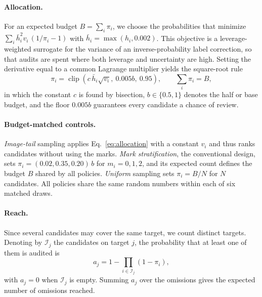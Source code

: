 \paragraph{Allocation.}
For an expected budget $B=\sum_i\pi_i$, we choose the probabilities that minimize $\sum_i \bar h_i^2 v_i\,(1/\pi_i-1)$ with $\bar h_i=\max(h_i,0.002)$. This objective is a leverage-weighted surrogate for the variance of an inverse-probability label correction, so that audits are spent where both leverage and uncertainty are high. Setting the derivative equal to a common Lagrange multiplier yields the square-root rule
\begin{equation}
 \pi_i=\operatorname{clip}\!\left(c\,\bar h_i\sqrt{v_i},\ 0.005b,\ 0.95\right),
 \qquad \textstyle\sum_i\pi_i=B,
 \label{eq:allocation}
\end{equation}
in which the constant $c$ is found by bisection, $b\in\{0.5,1\}$ denotes the half or base budget, and the floor $0.005b$ guarantees every candidate a chance of review.

\paragraph{Budget-matched controls.}
\emph{Image-tail} sampling applies Eq.~\eqref{eq:allocation} with a constant $v_i$ and thus ranks candidates without using the marks. \emph{Mark stratification}, the conventional design, sets $\pi_i=(0.02,0.35,0.20)\,b$ for $m_i=0,1,2$, and its expected count defines the budget $B$ shared by all policies. \emph{Uniform} sampling sets $\pi_i=B/N$ for $N$ candidates. All policies share the same random numbers within each of six matched draws.

\paragraph{Reach.}
Since several candidates may cover the same target, we count distinct targets. Denoting by $\mathcal I_j$ the candidates on target $j$, the probability that at least one of them is audited is
\begin{equation}
 a_j=1-\textstyle\prod_{i\in\mathcal I_j}(1-\pi_i),
 \label{eq:reach}
\end{equation}
with $a_j=0$ when $\mathcal I_j$ is empty. Summing $a_j$ over the omissions gives the expected number of omissions reached.

